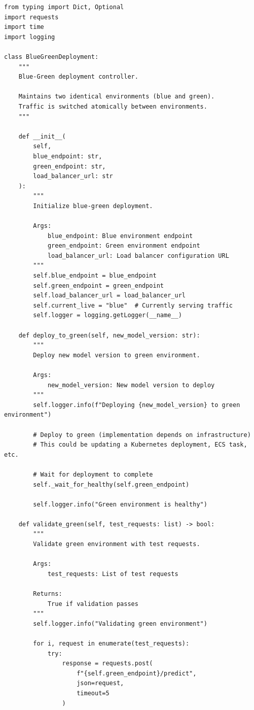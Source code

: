 \begin{lstlisting}[style=python, caption={Blue-Green Deployment Controller}]
from typing import Dict, Optional
import requests
import time
import logging

class BlueGreenDeployment:
    """
    Blue-Green deployment controller.

    Maintains two identical environments (blue and green).
    Traffic is switched atomically between environments.
    """

    def __init__(
        self,
        blue_endpoint: str,
        green_endpoint: str,
        load_balancer_url: str
    ):
        """
        Initialize blue-green deployment.

        Args:
            blue_endpoint: Blue environment endpoint
            green_endpoint: Green environment endpoint
            load_balancer_url: Load balancer configuration URL
        """
        self.blue_endpoint = blue_endpoint
        self.green_endpoint = green_endpoint
        self.load_balancer_url = load_balancer_url
        self.current_live = "blue"  # Currently serving traffic
        self.logger = logging.getLogger(__name__)

    def deploy_to_green(self, new_model_version: str):
        """
        Deploy new model version to green environment.

        Args:
            new_model_version: New model version to deploy
        """
        self.logger.info(f"Deploying {new_model_version} to green environment")

        # Deploy to green (implementation depends on infrastructure)
        # This could be updating a Kubernetes deployment, ECS task, etc.

        # Wait for deployment to complete
        self._wait_for_healthy(self.green_endpoint)

        self.logger.info("Green environment is healthy")

    def validate_green(self, test_requests: list) -> bool:
        """
        Validate green environment with test requests.

        Args:
            test_requests: List of test requests

        Returns:
            True if validation passes
        """
        self.logger.info("Validating green environment")

        for i, request in enumerate(test_requests):
            try:
                response = requests.post(
                    f"{self.green_endpoint}/predict",
                    json=request,
                    timeout=5
                )


\end{lstlisting}
